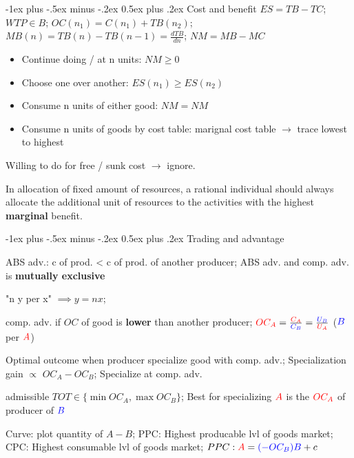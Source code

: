 \documentclass[a4paper]{article}
\makeatletter
\renewcommand{\section}{\@startsection{section}{1}{0mm}%
                                {-1ex plus -.5ex minus -.2ex}%
                                {0.5ex plus .2ex}%
                                {\normalfont\small\bfseries}}
\makeatother
\begin{document}
\tiny

\begin{multicols*}{3}
    \section{Cost and benefit}
    $ES=TB-TC$; $WTP\in B$; $OC(n_1) = C(n_1) + TB(n_2)$; $MB(n) = TB(n)-TB(n-1) = \frac{dTB}{dn}$; $NM = MB - MC$

    \begin{itemize}
        \item Continue doing / at n units: $NM \geq 0$
        \item Choose one over another: $ES(n_1) \geq ES(n_2)$
        \item Consume n units of either good: $NM=NM$
        \item Consume n units of goods by cost table: marignal cost table $\to$ trace lowest to highest
    \end{itemize}

    Willing to do for free / sunk cost $\to$ ignore.

    In allocation of fixed amount of resources, a rational individual should always allocate the additional unit of resources to the activities with the highest \textbf{marginal} benefit.

    \section{Trading and advantage}

    ABS adv.: c of prod. < c of prod. of another producer; ABS adv. and comp. adv. is \textbf{mutually exclusive}

    "n y per x" $\implies y = nx$;

    comp. adv. if $OC$ of good is \textbf{lower} than another producer; $\textcolor{red}{OC_{A}} = \frac{\textcolor{red}{C_A}}{\textcolor{blue}{C_B}} = \frac{\textcolor{blue}{U_B}}{\textcolor{red}{U_A}}$ ($\textcolor{blue}{B}$ per $\textcolor{red}{A}$)

    Optimal outcome when producer specialize good with comp. adv.; Specialization gain $\propto$ $OC_{A} - OC_{B}$; Specialize at comp. adv.

    admissible $TOT \in \{\min{OC_{A}}, \max{OC_{B}}\}$; Best for specializing $\textcolor{red}{A}$ is the $\textcolor{red}{OC_A}$ of producer of $\textcolor{blue}{B}$

    Curve: plot quantity of $A-B$; PPC: Highest producable lvl of goods market; CPC: Highest consumable lvl of goods market; $PPC: \textcolor{red}{A} = \textcolor{blue}{(-OC_B)B}+c$


\end{multicols*}
\end{document}
